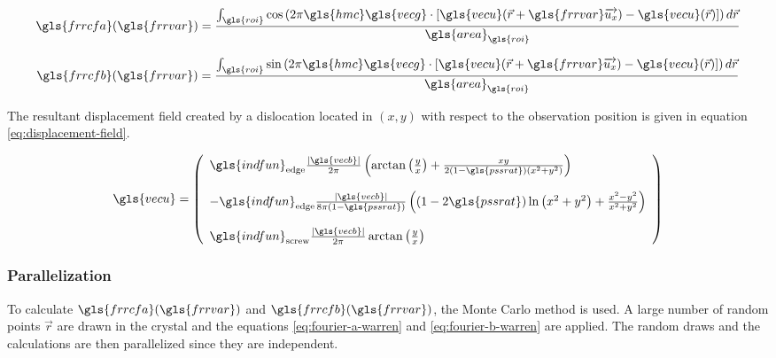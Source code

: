 \begin{equation}\label{eq:fourier-a-warren}
\gls{frrcfa}(\gls{frrvar}) = \frac{\int_{\gls{roi}} \cos \left( 2 \pi \gls{hmc} \gls{vecg} \cdot \left[ \gls{vecu}(\vec{r} + \gls{frrvar} \overrightarrow{u_x}) - \gls{vecu}(\vec{r}) \right] \right) d\vec{r}}{\gls{area}_{\gls{roi}}}
\end{equation}

\begin{equation}\label{eq:fourier-b-warren}
\gls{frrcfb}(\gls{frrvar}) = \frac{\int_{\gls{roi}} \sin \left( 2 \pi \gls{hmc} \gls{vecg} \cdot \left[ \gls{vecu}(\vec{r} + \gls{frrvar} \overrightarrow{u_x}) - \gls{vecu}(\vec{r}) \right] \right) d\vec{r}}{\gls{area}_{\gls{roi}}}
\end{equation}

\medskip

The resultant displacement field created by a dislocation located in \( ( x, y ) \) with respect to the observation position is given in equation \eqref{eq:displacement-field}.

\begin{align}\label{eq:displacement-field}
\gls{vecu} =
  \left( \begin{array}{l}
    \gls{indfun}_{\mathrm{edge}} \frac{| \gls{vecb} |}{2 \pi} \left( \arctan \left( \frac{y}{x} \right) + \frac{x y}{2 (1 - \gls{pssrat}) \left( x^2 + y^2 \right)} \right)
    \\[5mm]
    - \gls{indfun}_{\mathrm{edge}} \frac{| \gls{vecb} |}{8 \pi (1 - \gls{pssrat})} \left( (1 - 2 \gls{pssrat}) \ln \left( x^2 + y^2 \right) + \frac{x^2 - y^2}{x^2 + y^2} \right)
    \\[5mm]
    \gls{indfun}_{\mathrm{screw}} \frac{| \gls{vecb} |}{2 \pi} \arctan \left( \frac{y}{x} \right)
  \end{array} \right)
\end{align}

\subsubsection{Parallelization}

To calculate \( \gls{frrcfa}(\gls{frrvar}) \) and \( \gls{frrcfb}(\gls{frrvar}) \), the Monte Carlo method is used.
A large number of random points \( \vec{r} \) are drawn in the crystal and the equations \eqref{eq:fourier-a-warren} and \eqref{eq:fourier-b-warren} are applied. The random draws and the calculations are then parallelized since they are independent.

